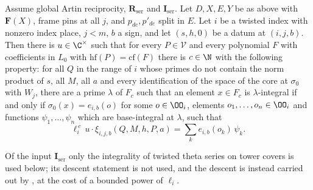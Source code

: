 \begin{theorem}\label{pf:baselat2:xicore}
Assume global Artin reciprocity, $\mathbf{R}_{\mathrm{ser}}$ and $\mathbf{I}_{\mathrm{ser}}$. Let $D,X,E,Y$ be as above with
$\mathbf{F}(X)$, frame pins at all $j$, and $p_{de},p'_{de}$ split in $E$. Let $i$ be a twisted index with nonzero
index place, $j<m$, $b$ a sign, and let $(s,h,0)$ be a datum at $(i,j,b)$. Then there is $u\in\C^\times$ such that
for every $P\in\mathcal V$ and every polynomial $F$ with coefficients in $L_0$ with $\mathrm{hf}(P)=\mathrm{cf}(F)$ there is
$c\in\N$ with the following property: for all $Q$ in the range of $i$ whose primes do not contain the norm
product of $s$, all $M$, all $a$ and every identification of the space of the core at $\sigma_0$ with $W_j$, there
are a prime $\lambda$ of $F_c$ such that an element $x\in F_c$ is $\lambda$-integral if and only if $\sigma_0(x)=e_{i,b}(o)$
for some $o\in\OO_i$, elements $o_1,\dots,o_n\in\OO_i$ and functions $\psi_1,\dots,\psi_n$ which are base-integral at
$\lambda$, such that
\[
  \ell_i^{\,c}\,u\cdot\xi_{i,j,b}(Q,M,h,P,a)=\sum_k e_{i,b}(o_k)\,\psi_k .
\]
\end{theorem}

\begin{remark}
Of the input $\mathbf I_{\mathrm{ser}}$ only the integrality of twisted theta series on tower covers is used below; its
descent statement is not used, and the descent is instead carried out by
, at the cost of a bounded power of $\ell_i$.
\end{remark}

